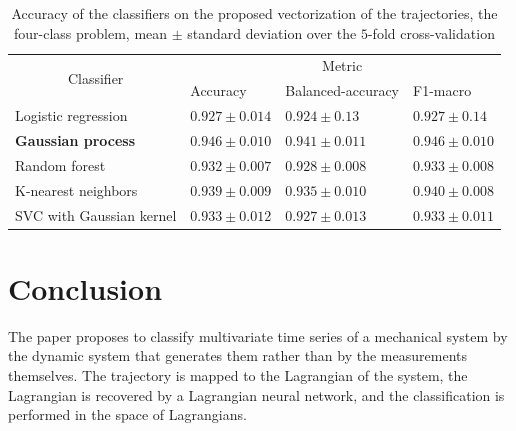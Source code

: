 \documentclass[sn-mathphys-num]{sn-jnl}
\theoremstyle{thmstylethree}
\theoremstyle{thmstyletwo}
\theoremstyle{thmstyleone}
\begin{document}
\begin{table}[!htbp]
    \caption{Accuracy of the classifiers on the proposed vectorization of the trajectories, the four-class problem, mean $\pm$ standard deviation over the $5$-fold cross-validation}
    \centering
    \begin{tabular}{|l|lll|}
    \hline
    \multicolumn{1}{|c|}{\multirow{2}{*}{Classifier}} & \multicolumn{3}{c|}{Metric}                                                                     	\\ \hhline{~---} 
    \multicolumn{1}{|c|}{}                               & \multicolumn{1}{l|}{Accuracy}         & \multicolumn{1}{l|}{Balanced-accuracy} & F1-macro        \\ \hline
    Logistic regression                              & \multicolumn{1}{l|}{$0.927 \pm  0.014$} & \multicolumn{1}{l|}{$0.924 \pm 0.13$}    & $0.927 \pm 0.14$  \\ \hline
    \textbf{Gaussian process}                                  & \multicolumn{1}{l|}{$\mathbf{0.946} \pm \mathbf{0.010}$}  & \multicolumn{1}{l|}{$\mathbf{0.941} \pm \mathbf{0.011}$}   & $\mathbf{0.946} \pm \mathbf{0.010}$ \\ \hline
    Random forest                                        & \multicolumn{1}{l|}{$0.932 \pm 0.007$}  & \multicolumn{1}{l|}{$0.928 \pm 0.008$}   & $0.933 \pm 0.008$ \\ \hline
    K-nearest neighbors                                  & \multicolumn{1}{l|}{$0.939 \pm 0.009$}  & \multicolumn{1}{l|}{$0.935 \pm 0.010$}   & $0.940 \pm 0.008$ \\ \hline
    SVC with Gaussian kernel                             & \multicolumn{1}{l|}{$0.933 \pm 0.012$}  & \multicolumn{1}{l|}{$0.927 \pm 0.013$}   & $0.933 \pm 0.011$ \\ \hline
    \end{tabular}
    \label{table:classifictors}
\end{table}

\section{Conclusion} \label{sec:conclusion}

The paper proposes to classify multivariate time series of a mechanical system by the dynamic system that generates them rather than by the measurements themselves. The trajectory is mapped to the Lagrangian of the system, the Lagrangian is recovered by a Lagrangian neural network, and the classification is performed in the space of Lagrangians.
\end{document}
